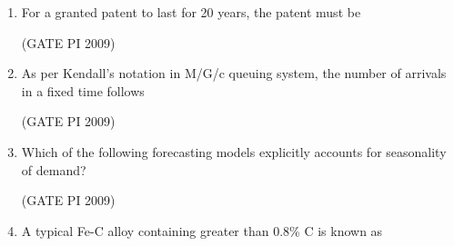 \documentclass[journal,12pt,onecolumn]{IEEEtran}
\theoremstyle{remark}
\begin{document}
\begin{enumerate}[label=Q.\arabic*]
(A) $h^2$ \hfill (B) $h^3$ \hfill(C) $h^4$ \hfill (D) $h^5$ 

\hfill (GATE PI 2009)
\item For a granted patent to last for 20 years, the patent must be
\begin{enumerate}[label=(\Alph*)]
\end{enumerate}

\hfill (GATE PI 2009)
\item As per Kendall's notation in M/G/c queuing system, the number of arrivals in a fixed time follows
\begin{enumerate}[label=(\Alph*)]
\end{enumerate}
\hfill (GATE PI 2009)
\item Which of the following forecasting models explicitly accounts for seasonality of demand?
\begin{enumerate}[label=(\Alph*)]
\end{enumerate}
\hfill (GATE PI 2009)
\item A typical Fe-C alloy containing greater than 0.8\% C is known as
\begin{enumerate}[label=(\Alph*)]
\end{enumerate}
\end{enumerate}
\end{document}
